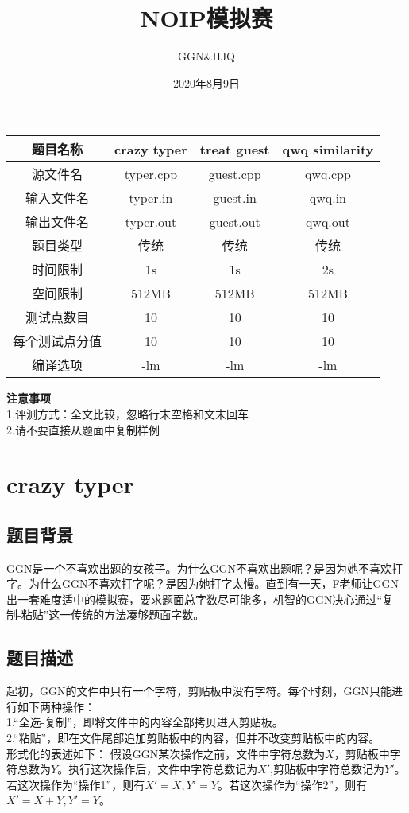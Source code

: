 \documentclass[12pt]{ctexart}
\title{\textbf{NOIP模拟赛}}
\author{GGN\&HJQ}
\date{2020年8月9日}
\begin{document}
\maketitle
\begin{center}
	\begin{tabular}{|c|c|c|c|}
		\hline 题目名称&crazy typer&treat guest&qwq similarity\\
		\hline 源文件名&typer.cpp&guest.cpp&qwq.cpp\\
		\hline 输入文件名&typer.in&guest.in&qwq.in\\
		\hline 输出文件名&typer.out&guest.out&qwq.out\\
		\hline 题目类型&传统&传统&传统\\
		\hline 时间限制&1s&1s&2s\\
		\hline 空间限制&512MB&512MB&512MB\\
		\hline 测试点数目&10&10&10\\
		\hline 每个测试点分值&10&10&10\\
		\hline 编译选项&-lm&-lm&-lm\\
		\hline
	\end{tabular}
\end{center}
\textbf{注意事项}\\
1.评测方式：全文比较，忽略行末空格和文末回车\\
2.请不要直接从题面中复制样例
\newpage
\section{crazy typer}
\subsection{题目背景}
GGN是一个不喜欢出题的女孩子。为什么GGN不喜欢出题呢？是因为她不喜欢打字。为什么GGN不喜欢打字呢？是因为她打字太慢。直到有一天，F老师让GGN出一套难度适中的模拟赛，要求题面总字数尽可能多，机智的GGN决心通过“复制-粘贴”这一传统的方法凑够题面字数。
\subsection{题目描述}
起初，GGN的文件中只有一个字符，剪贴板中没有字符。每个时刻，GGN只能进行如下两种操作：\\
1.“全选-复制”，即将文件中的内容全部拷贝进入剪贴板。\\
2.“粘贴”，即在文件尾部追加剪贴板中的内容，但并不改变剪贴板中的内容。\\

形式化的表述如下：
假设GGN某次操作之前，文件中字符总数为$X$，剪贴板中字符总数为$Y$。执行这次操作后，文件中字符总数记为$X'$,剪贴板中字符总数记为$Y'$。\\
若这次操作为“操作1”，则有$X'=X,Y'=Y$。若这次操作为“操作2”，则有$X'=X+Y,Y'=Y$。\\
\end{document}
